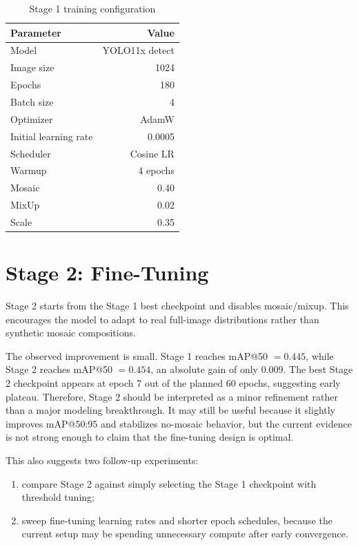 \documentclass[12pt,a4paper]{report}
\begin{document}
\begin{table}[H]
\centering
\caption{Stage 1 training configuration}
\label{tab:stage1-config}
\begin{tabular}{lr}
\toprule
\textbf{Parameter} & \textbf{Value} \\
\midrule
Model & YOLO11x detect \\
Image size & 1024 \\
Epochs & 180 \\
Batch size & 4 \\
Optimizer & AdamW \\
Initial learning rate & 0.0005 \\
Scheduler & Cosine LR \\
Warmup & 4 epochs \\
Mosaic & 0.40 \\
MixUp & 0.02 \\
Scale & 0.35 \\
\bottomrule
\end{tabular}
\end{table}

\section{Stage 2: Fine-Tuning}
Stage 2 starts from the Stage 1 best checkpoint and disables mosaic/mixup. This encourages the model to adapt to real full-image distributions rather than synthetic mosaic compositions.

The observed improvement is small. Stage 1 reaches mAP@50 \(=0.445\), while Stage 2 reaches mAP@50 \(=0.454\), an absolute gain of only \(0.009\). The best Stage 2 checkpoint appears at epoch 7 out of the planned 60 epochs, suggesting early plateau. Therefore, Stage 2 should be interpreted as a minor refinement rather than a major modeling breakthrough. It may still be useful because it slightly improves mAP@50:95 and stabilizes no-mosaic behavior, but the current evidence is not strong enough to claim that the fine-tuning design is optimal.

This also suggests two follow-up experiments:

\begin{enumerate}
    \item compare Stage 2 against simply selecting the Stage 1 checkpoint with threshold tuning;
    \item sweep fine-tuning learning rates and shorter epoch schedules, because the current setup may be spending unnecessary compute after early convergence.
\end{enumerate}
\end{document}
